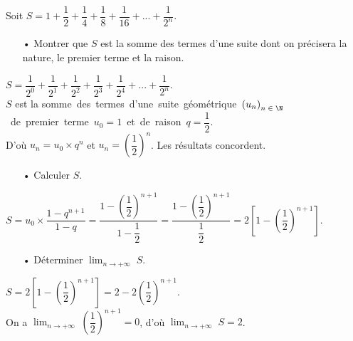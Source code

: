 Soit $S = 1 + \dfrac{1}{2} + \dfrac{1}{4} + \dfrac{1}{8} + \dfrac{1}{16} + ... + \dfrac{1}{2^n}$. \\

\begin{itemize}
\item[•] Montrer que $S$ est la somme des termes d'une suite dont on précisera la nature, le premier terme et la raison. 
\end{itemize}

\vspace*{.3cm}

$S = \dfrac{1}{2^0} + \dfrac{1}{2^1} + \dfrac{1}{2^2} + \dfrac{1}{2^3} + \dfrac{1}{2^4} + ... + \dfrac{1}{2^n}$. \\

$S$ est la \hbox{somme des termes d'une suite géométrique $\left(u_n\right)_{n \; \in \; \N}$ de premier terme $u_0 = 1$ et de raison $q = \dfrac{1}{2}$.} \\

D'où $u_n = u_0 \times q^n$ et $u_n = \left(\dfrac{1}{2}\right)^n$. Les résultats concordent. \\

\begin{itemize}
\item[•] Calculer $S$. \\
\end{itemize}

\vspace*{-.3cm}

$S = u_0 \times \dfrac{1-q^{n+1}}{1-q} = \dfrac{1-\left(\dfrac{1}{2}\right)^{n+1}}{1-\dfrac{1}{2}} = \dfrac{1-\left(\dfrac{1}{2}\right)^{n+1}}{\dfrac{1}{2}} = 2\left[1-\left(\dfrac{1}{2}\right)^{n+1}\right]$. \\

\begin{itemize}
\item[•] Déterminer $\displaystyle {\lim_{n \rightarrow +\infty}} \; S$. \\
\end{itemize}

$S = 2\left[1-\left(\dfrac{1}{2}\right)^{n+1}\right] = 2 - 2\left(\dfrac{1}{2}\right)^{n+1}$. \vspace*{.3cm} \\

On a $\displaystyle {\lim_{n \rightarrow +\infty}} \; \left(\dfrac{1}{2}\right)^{n+1} = 0$, d'où $\displaystyle {\lim_{n \rightarrow +\infty}} \; S = 2$. \vspace*{.3cm} \\

